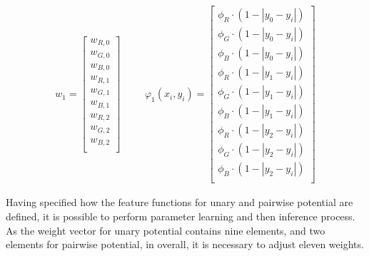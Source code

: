 \begin{equation}
    \label{eq:vectors_nonlinear}
    \begin{matrix} 
        w_1 = \begin{bmatrix}
            w_{R,0}\\ 
            w_{G,0}\\
            w_{B,0}\\
            w_{R,1}\\ 
            w_{G,1}\\
            w_{B,1}\\
            w_{R,2}\\ 
            w_{G,2}\\
            w_{B,2}\\
        \end{bmatrix}
        & & &
        \varphi_1(x_i,y_i) = \begin{bmatrix}
            \phi_{R} \cdot (1-\left | y_0 - y_i \right |)\\ 
            \phi_{G} \cdot (1-\left | y_0 - y_i \right |)\\
            \phi_{B} \cdot (1-\left | y_0 - y_i \right |)\\
            \phi_{R} \cdot (1-\left | y_1 - y_i \right |)\\ 
            \phi_{G} \cdot (1-\left | y_1 - y_i \right |)\\
            \phi_{B} \cdot (1-\left | y_1 - y_i \right |)\\
            \phi_{R} \cdot (1-\left | y_2 - y_i \right |)\\ 
            \phi_{G} \cdot (1-\left | y_2 - y_i \right |)\\
            \phi_{B} \cdot (1-\left | y_2 - y_i \right |)\\
        \end{bmatrix}
    \end{matrix} 
\end{equation}

Having specified how the feature functions for unary and pairwise potential are defined, it is possible to perform parameter learning and then inference process. As the weight vector for unary potential contains nine elements, and two elements for pairwise potential, in overall, it is necessary to adjust eleven weights. 
